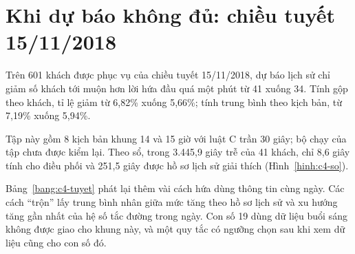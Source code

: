 \section{Khi dự báo không đủ: chiều tuyết 15/11/2018}
\label{muc:c4-tuyet}

Trên 601 khách được phục vụ của chiều tuyết 15/11/2018, dự báo lịch sử chỉ giảm số khách tới muộn hơn lời hứa đầu
quá một phút từ 41 xuống 34. Tính gộp theo khách, tỉ lệ giảm từ 6,82\% xuống 5,66\%; tính trung bình theo kịch bản,
từ 7,19\% xuống 5,94\%.

Tập này gồm 8 kịch bản khung 14 và 15 giờ với luật C trần 30 giây; bộ chạy của tập chưa được kiểm lại. Theo sổ, trong
3.445,9 giây trễ của 41 khách, chỉ 8,6 giây tính cho điều phối và 251,5 giây được hồ sơ lịch sử giải thích
(Hình~\ref{hinh:c4-so}).

Bảng~\ref{bang:c4-tuyet} phát lại thêm vài cách hứa dùng thông tin cùng ngày. Các cách ``trộn'' lấy trung bình nhân
giữa mức tăng theo hồ sơ lịch sử và xu hướng tăng gần nhất của hệ số tắc đường trong ngày. Con số 19 dùng dữ liệu
buổi sáng không được giao cho khung này, và một quy tắc có ngưỡng chọn sau khi xem dữ liệu cũng cho con số đó.

